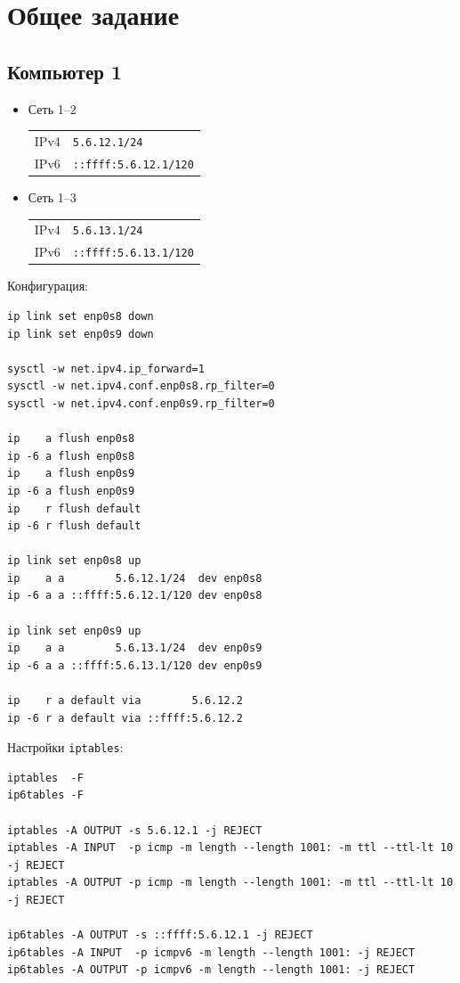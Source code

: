 \section{Общее задание}

\subsection{Компьютер 1}
\begin{itemize}
    \item Сеть 1--2

    \begin{tabular}{ll}
        IPv4 & \texttt{5.6.12.1/24}         \\
        IPv6 & \texttt{::ffff:5.6.12.1/120} \\
    \end{tabular}

    \item Сеть 1--3

    \begin{tabular}{ll}
        IPv4 & \texttt{5.6.13.1/24}         \\
        IPv6 & \texttt{::ffff:5.6.13.1/120} \\
    \end{tabular}
\end{itemize}

Конфигурация:
\begin{verbatim}
ip link set enp0s8 down
ip link set enp0s9 down

sysctl -w net.ipv4.ip_forward=1
sysctl -w net.ipv4.conf.enp0s8.rp_filter=0
sysctl -w net.ipv4.conf.enp0s9.rp_filter=0

ip    a flush enp0s8
ip -6 a flush enp0s8
ip    a flush enp0s9
ip -6 a flush enp0s9
ip    r flush default
ip -6 r flush default

ip link set enp0s8 up
ip    a a        5.6.12.1/24  dev enp0s8
ip -6 a a ::ffff:5.6.12.1/120 dev enp0s8

ip link set enp0s9 up
ip    a a        5.6.13.1/24  dev enp0s9
ip -6 a a ::ffff:5.6.13.1/120 dev enp0s9

ip    r a default via        5.6.12.2
ip -6 r a default via ::ffff:5.6.12.2
\end{verbatim}

Настройки \texttt{iptables}:
\begin{verbatim}
iptables  -F
ip6tables -F

iptables -A OUTPUT -s 5.6.12.1 -j REJECT
iptables -A INPUT  -p icmp -m length --length 1001: -m ttl --ttl-lt 10 -j REJECT
iptables -A OUTPUT -p icmp -m length --length 1001: -m ttl --ttl-lt 10 -j REJECT

ip6tables -A OUTPUT -s ::ffff:5.6.12.1 -j REJECT
ip6tables -A INPUT  -p icmpv6 -m length --length 1001: -j REJECT
ip6tables -A OUTPUT -p icmpv6 -m length --length 1001: -j REJECT
\end{verbatim}

